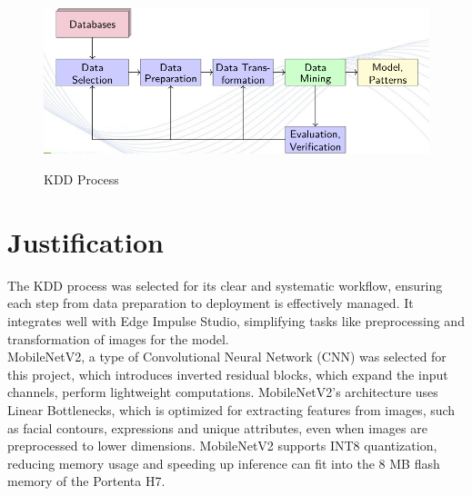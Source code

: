 \begin{figure}
	\begin{center}
		\includegraphics[width=0.7\linewidth]{Images/EdgeImpulse/KDDProcessWings.png}
		\caption{KDD Process}
		\label{fig:KDDProcess}
		\cite{Wings:2024}
	\end{center}
\end{figure}


\section{Justification}

The KDD process was selected for its clear and systematic workflow, ensuring each step from data preparation to deployment is effectively managed. It integrates well with Edge Impulse Studio, simplifying tasks like preprocessing and transformation of images for the model. \\
MobileNetV2, a type of Convolutional Neural Network (CNN) was selected for this project, which introduces inverted residual blocks, which expand the input channels, perform lightweight computations. MobileNetV2’s architecture uses Linear Bottlenecks, which is optimized for extracting features from images, such as facial contours, expressions and unique attributes, even when images are preprocessed to lower dimensions. MobileNetV2 supports INT8 quantization, reducing memory usage and speeding up inference can fit into the 8 MB flash memory of the Portenta H7.